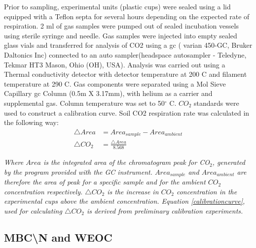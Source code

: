 \documentclass[12pt]{report}
\begin{document}
		Prior to sampling, experimental units (plastic cups) were sealed using a lid equipped with a Teflon septa for several hours depending on the expected rate of respiration. 2 ml of gas samples were pumped out of sealed incubation vessels using sterile syringe and needle. Gas samples were injected into empty sealed glass vials and transferred for analysis of CO2 using a \gls{gc} ( varian 450-GC, Bruker Daltonics Inc) connected to an auto sampler(headspace autosampler - Teledyne, Tekmar HT3 Mason, Ohio (OH), USA). Analysis was carried out using a Thermal conductivity detector  with detector temperature at 200 C and filament temperature at 290 C. Gas components were separated using a Mol Sieve Capillary \gls{gc} Column (0.5m X 3.17mm), with helium as a carrier and supplemental gas. Column temperature was set to 50$ ^\circ $ C. $ CO_2 $  standards were used to construct a calibration curve.
		Soil CO2 respiration rate was calculated in the following way:\\
		
		\begin{align} %
		\triangle Area &= Area_{sample} - Area_{ambient}\\
		\triangle CO_2 &= \frac{\triangle Area}{8.568} \label{calibrationcurve}
		\end{align}
		
		\begin{adjustwidth}{50pt}{50pt}
			\begin{footnotesize}
				\textit{Where $Area$ is the integrated area of the chromatogram peak for CO$_2$, generated by the program provided with the GC instrument. $ Area_{sample} $ and $  Area_{ambient} $ are therefore the area of peak for a specific sample and for the ambient  $ CO_2 $ concentration respectively.  $\triangle CO_2$  is the increase in $ CO_2 $ concentration in the experimental cups above the ambient concentration. Equation \eqref{calibrationcurve}, used for calculating  $\triangle CO_2$ is derived from preliminary calibration experiments.}
			\end{footnotesize}
		\end{adjustwidth}
		
		\subsection{MBC\textbackslash{}N and WEOC}
		
\end{document}
